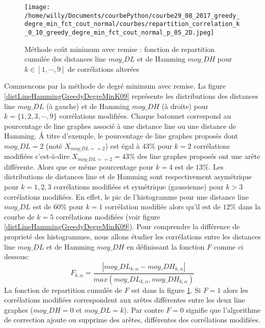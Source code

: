 \documentclass[onecolumn, 12pt]{book}
\begin{document}
\begin{centering} 
\begin{figure}[htb!] 
\texttt{[image: /home/willy/Documents/courbePython/courbe29\_08\_2017\_greedy\_degre\_min\_fct\_cout\_normal/courbes/repartition\_correlation\_k\_0\_10\_greedy\_degre\_min\_fct\_cout\_normal\_p\_05\_2D.jpeg]}
\caption{ M\'ethode co\^ut minimum avec remise : fonction de repartition cumul\'ee des distances line $moy\_DL$ et de Hamming $moy\_DH$ pour $k \in [1, \cdots, 9]$ de corr\'elations alter\'ees}
\label{fctRepartitionCumuleDistLineHammingGreedyDegreMinK09} 
\end{figure}
\end{centering} 
Commencons par la m\'ethode de degr\'e minimum avec remise.
La figure \ref{distLineHammingGreedyDegreMinK09} repr\'esente les distributions des distances line $moy\_DL$ (\`a gauche) et de Hamming $moy\_DH$ (\`a droite) pour  $k = \{1,2,3,\cdots, 9\}$ corr\'elations modifi\'ees. 
Chaque batonnet correspond au pourcentage de line graphes associ\'e \`a une distance line ou une distance de Hamming. \'A titre d'exemple, le pourcentage de line graphes propos\'es dont $moy\_DL = 2$ (not\'e $X_{moy\_DL==2}$) est \'egal \`a $43\%$ pour $k = 2$ corr\'elations modifi\'ees c'est-\`a-dire $X_{moy\_DL==2} = 43\%$ des line graphes propos\'es ont une ar\^ete diff\'erente. Alors que ce m\^eme pourcentage pour $k = 4$ est de $13\%$. 
Les distributions de distances line et de Hamming sont respectivement asym\'etrique pour $k = 1,2,3$ corr\'elations modifi\'ees et sym\'etrique (gaussienne) pour $k > 3$ corr\'elations modifi\'ees.
En effet, le pic de l'histogramme pour une distance line $moy\_DL$ est de $60\%$ pour $k=1$ corr\'elation modifi\'ee alors qu'il est de  $12\%$ dans la courbe de $k=5$ corr\'elations modifi\'ees (voir figure \ref{distLineHammingGreedyDegreMinK09}).
Pour comprendre la diff\'erence de propriet\'e des histogrammes, nous allons \'etudier les corr\'elations entre les distances line $moy\_DL$ et de Hamming $moy\_DH$ en d\'efinissant la fonction $F$ comme ci dessous:
\begin{equation}
\label{formuleCorrelation}
F_{k, \alpha} = \frac{ | moy\_DL_{k, \alpha} - moy\_DH_{k, \alpha} | }{ max(moy\_DL_{k, \alpha},  moy\_DH_{k, \alpha}) }
\end{equation}
La fonction de repartition cumul\'ee de $F$ est dans la figure \ref{fctRepartitionCumuleDistLineHammingGreedyDegreMinK09}.
Si $F = 1$ alors les corr\'elations modifi\'ees correspondent aux ar\^etes diff\'erentes entre les deux line graphes ($moy\_DH = 0$ et $moy\_DL = k$). Par contre $F = 0$ signifie que l'algorithme de correction ajoute ou supprime des ar\^etes, diff\'erentes des corr\'elations modifi\'ees.  
\end{document}
